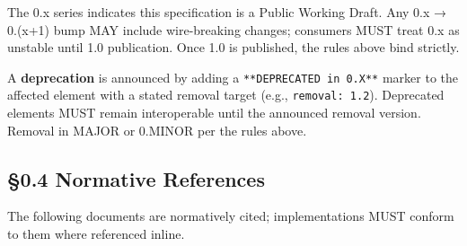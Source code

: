 \documentclass[10pt]{article}
\begin{document}
The 0.x series indicates this specification is a Public Working Draft. Any 0.x → 0.(x+1) bump MAY include wire-breaking changes; consumers MUST treat 0.x as unstable until 1.0 publication. Once 1.0 is published, the rules above bind strictly.


A \textbf{deprecation} is announced by adding a \texttt{**DEPRECATED in 0.X**} marker to the affected element with a stated removal target (e.g., \texttt{removal: 1.2}). Deprecated elements MUST remain interoperable until the announced removal version. Removal in MAJOR or 0.MINOR per the rules above.



\subsection*{§0.4 Normative References}


The following documents are normatively cited; implementations MUST conform to them where referenced inline.
\end{document}
